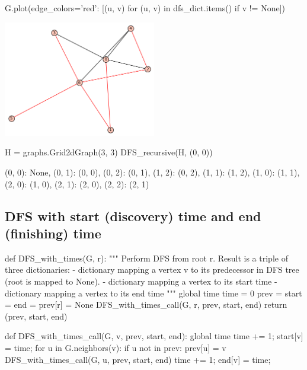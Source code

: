 \begin{sageCell}
   G.plot(edge_colors={'red': [(u, v) for (u, v) in dfs_dict.items() if v != None]})
\end{sageCell}
\begin{outImage}
   \includegraphics[width=0.5\textwidth]{Images/DFS/dfs_tree.png}
\end{outImage}

\begin{sageCell}
   H = graphs.Grid2dGraph(3, 3)
   DFS_recursive(H, (0, 0))
\end{sageCell}
\begin{outCell}
   {(0, 0): None,
    (0, 1): (0, 0),
    (0, 2): (0, 1),
    (1, 2): (0, 2),
    (1, 1): (1, 2),
    (1, 0): (1, 1),
    (2, 0): (1, 0),
    (2, 1): (2, 0),
    (2, 2): (2, 1)}
\end{outCell}

\subsection{DFS with start (discovery) time and end (finishing) time}

\begin{sageCell}
def DFS_with_times(G, r):
    """
    Perform DFS from root r. Result is a triple of three dictionaries:
    - dictionary mapping a vertex v to its predecessor in DFS tree
      (root is mapped to None).
    - dictionary mapping a vertex to its start time
    - dictionary mapping a vertex to its end time
    """
    global time
    time = 0
    prev = {}
    start = {}
    end = {}
    prev[r] = None
    DFS_with_times_call(G, r, prev, start, end)
    return (prev, start, end)

def DFS_with_times_call(G, v, prev, start, end):
    global time
    time += 1;
    start[v] = time;
    for u in G.neighbors(v):
        if u not in prev:
            prev[u] = v
            DFS_with_times_call(G, u, prev, start, end)
    time += 1;
    end[v] = time;
\end{sageCell}

